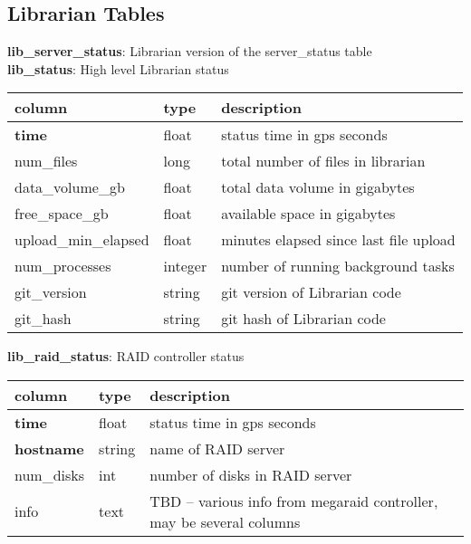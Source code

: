 \documentclass{article}
\begin{document}
\subsection{Librarian Tables}
\textbf{\large{lib\_server\_status}}: Librarian version of the server\_status table\\

\textbf{\large{lib\_status}}: High level Librarian status
\begin{center}
 \begin{tabular}{| p{4cm} | p{2cm} | p{10cm} |} 
\hline
 column & type & description \\ [0.5ex]  \hline\hline
\textbf{time} & float & status time in gps seconds \\ \hline
num\_files & long & total number of files in librarian  \\\hline
data\_volume\_gb & float & total data volume in gigabytes  \\\hline
free\_space\_gb & float & available space in gigabytes  \\\hline
upload\_min\_elapsed & float & minutes elapsed since last file upload \\\hline
num\_processes & integer & number of running background tasks  \\\hline
git\_version & string & git version of Librarian code  \\\hline
git\_hash & string & git hash of Librarian code  \\\hline
\end{tabular}
\end{center}

\textbf{\large{lib\_raid\_status}}: RAID controller status
\begin{center}
 \begin{tabular}{| p{4cm} | p{2cm} | p{10cm} |} 
\hline
 column & type & description \\ [0.5ex]  \hline\hline
\textbf{time} & float & status time in gps seconds \\ \hline
\textbf{hostname} & string & name of RAID server \\ \hline
num\_disks & int & number of disks in RAID server  \\\hline
info & text & TBD -- various info from megaraid controller, may be several columns \\\hline
\end{tabular}
\end{center}
\end{document}
